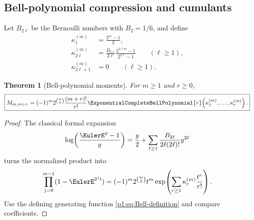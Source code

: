 \documentclass[11pt,oneside]{article}
\numberwithin{equation}{section}
\newtheorem{theorem}{Theorem}[section]
\theoremstyle{definition}
\theoremstyle{remark}
\begin{document}
\subsection{Bell-polynomial compression and cumulants}

Let \(B_{2\ell}\) be the Bernoulli numbers with \(B_2=1/6\), and define
\begin{align}
 \kappa_1^{(m)}&=\frac{2^m-1}{2},
 \label{p1:eq:kappa-one}\\
 \kappa_{2\ell}^{(m)}
 &=\frac{B_{2\ell}}{2\ell}
   \frac{2^{2\ell m}-1}{2^{2\ell}-1}
   \qquad(\ell\ge1),
 \label{p1:eq:kappa-even}\\
 \kappa_{2\ell+1}^{(m)}&=0
   \qquad(\ell\ge1).
 \label{p1:eq:kappa-odd}
\end{align}

\begin{theorem}[Bell-polynomial moments]
\label{p1:thm:Bell-moments}
For \(m\ge1\) and \(r\ge0\),
\begin{equation}
  \boxed{
  M_{m,m+r}=(-1)^m2^{\binom m2}
    \frac{(m+r)!}{r!}
    \ExponentialCompleteBellPolynomial{r}\!\left(
       \kappa_1^{(m)},\ldots,\kappa_r^{(m)}
    \right).}
  \label{p1:eq:Bell-moments}
\end{equation}
\end{theorem}

\begin{proof}
The classical formal expansion
\begin{equation}
  \log\!\left(\frac{\EulerE^y-1}{y}\right)
  =\frac y2+
   \sum_{\ell\ge1}
   \frac{B_{2\ell}}{2\ell(2\ell)!}y^{2\ell}
  \label{p1:eq:log-expm1}
\end{equation}
turns the normalized product into
\begin{equation}
 \prod_{j=0}^{m-1}(1-\EulerE^{2^jt})
 =(-1)^m2^{\binom m2}t^m
  \exp\!\left(
    \sum_{r\ge1}\kappa_r^{(m)}\frac{t^r}{r!}
  \right).
  \label{p1:eq:moment-Bell-factor}
\end{equation}
Use the defining generating function \eqref{p1:eq:Bell-definition} and compare
coefficients.
\end{proof}
\end{document}
